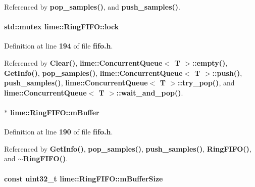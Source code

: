 Referenced by {\bf pop\+\_\+samples()}, and {\bf push\+\_\+samples()}.

\paragraph[{lock}]{\setlength{\rightskip}{0pt plus 5cm}std\+::mutex lime\+::\+Ring\+F\+I\+F\+O\+::lock\hspace{0.3cm}{\ttfamily [protected]}}\label{classlime_1_1RingFIFO_a71a641d759a357d3f0d011100b179872}


Definition at line {\bf 194} of file {\bf fifo.\+h}.



Referenced by {\bf Clear()}, {\bf lime\+::\+Concurrent\+Queue$<$ T $>$\+::empty()}, {\bf Get\+Info()}, {\bf pop\+\_\+samples()}, {\bf lime\+::\+Concurrent\+Queue$<$ T $>$\+::push()}, {\bf push\+\_\+samples()}, {\bf lime\+::\+Concurrent\+Queue$<$ T $>$\+::try\+\_\+pop()}, and {\bf lime\+::\+Concurrent\+Queue$<$ T $>$\+::wait\+\_\+and\+\_\+pop()}.

\paragraph[{m\+Buffer}]{$\ast$ lime\+::\+Ring\+F\+I\+F\+O\+::m\+Buffer\hspace{0.3cm}{\ttfamily [protected]}}\label{classlime_1_1RingFIFO_ad3b9ef198edb51819d6500638d83a2df}


Definition at line {\bf 190} of file {\bf fifo.\+h}.



Referenced by {\bf Get\+Info()}, {\bf pop\+\_\+samples()}, {\bf push\+\_\+samples()}, {\bf Ring\+F\+I\+F\+O()}, and {\bf $\sim$\+Ring\+F\+I\+F\+O()}.

\paragraph[{m\+Buffer\+Size}]{\setlength{\rightskip}{0pt plus 5cm}const uint32\+\_\+t lime\+::\+Ring\+F\+I\+F\+O\+::m\+Buffer\+Size\hspace{0.3cm}{\ttfamily [protected]}}\label{classlime_1_1RingFIFO_a3d252067ce4324188b1bc46459e7678a}


